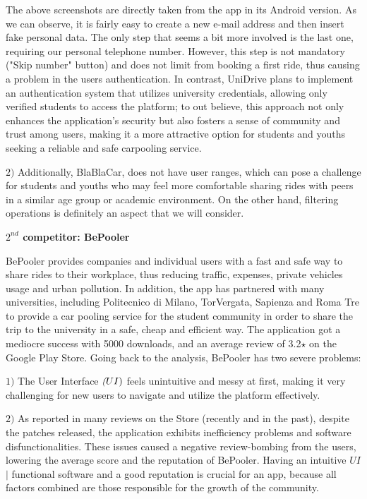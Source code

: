\documentclass{article}
\begin{document}
The above screenshots are directly taken from the app in its Android version. As we can observe, it is fairly easy to create a new e-mail address and then insert fake personal data. The only step that seems a bit more involved is the last one, requiring our personal telephone number. However, this step is not mandatory ("Skip number" button) and does not limit from booking a first ride, thus causing a problem in the users authentication. In contrast, UniDrive plans to implement an authentication system that utilizes university credentials, allowing only verified students to access the platform; to out believe, this approach not only enhances the application's security but also fosters a sense of community and trust among users, making it a more attractive option for students and youths seeking a reliable and safe carpooling service. \newline 

\textbf{$2)$} Additionally, BlaBlaCar, does not have user ranges, which can pose a challenge for students and youths who may feel more comfortable sharing rides with peers in a similar age group or academic environment. On the other hand, filtering operations is definitely an aspect that we will consider. \newline 

\textbf{$2^{nd}$ competitor: BePooler}
\graphicspath{{Doc images/Competitor Analysis/BePooler}}

BePooler provides companies and individual users with a fast and safe way to share rides to their workplace, thus reducing traffic, expenses, private vehicles usage and urban pollution. In addition, the app has partnered with many universities, including Politecnico di Milano, TorVergata, Sapienza and Roma Tre to provide a car pooling service for the student community in order to share the trip to the university in a safe, cheap and efficient way. The application got a mediocre success with 5000 downloads, and an average review of 3.2$\star$ on the Google Play Store. Going back to the analysis, BePooler has two severe problems: \newline 

\textbf{$1)$} The User Interface $\textit(UI)$ feels unintuitive and messy at first, making it very challenging for new users to navigate and utilize the platform effectively. \newline

\textbf{$2)$} As reported in many reviews on the Store (recently and in the past), despite the patches released, the application exhibits inefficiency problems and software disfunctionalities. These issues caused a negative review-bombing from the users, lowering the average score and the reputation of BePooler. Having an intuitive $\textit{UI}$ $\vert$ functional software and a good reputation is crucial for an app, because all factors combined are those responsible for the growth of the community. \newline  
\end{document}
